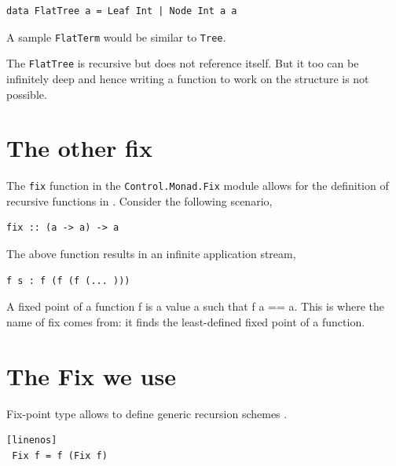 \documentclass[proposal.tex]{subfiles}
\begin{document}
\begin{verbatim}
data FlatTree a = Leaf Int | Node Int a a
\end{verbatim}  

A sample \texttt{FlatTerm} would be similar to \texttt{Tree}. 

The \texttt{FlatTree} is recursive but does not reference itself. But it too can be infinitely deep and hence writing a function to work on the structure
is not possible.  

\section{The other fix}

The \texttt{fix} function in the \texttt{Control.Monad.Fix} module allows for the definition of recursive functions in . Consider the 
following scenario,

\begin{verbatim}
fix :: (a -> a) -> a
\end{verbatim}
The above function results in an infinite application stream,

\begin{verbatim}
f s : f (f (f (... )))
\end{verbatim} 

A fixed point of a function f is a value a such that f a == a. This is where the name of fix comes from: it finds the least-defined fixed point of a function.



\section{The Fix we use}
Fix-point type allows to define generic recursion schemes \cite{data-fix-lib}.

\begin{verbatim}[linenos]
 Fix f = f (Fix f)
\end{verbatim}
\end{document}
